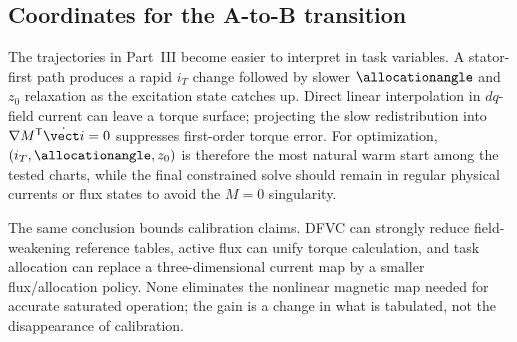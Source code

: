 \subsection{Coordinates for the A-to-B transition}

The trajectories in Part~III become easier to interpret in task variables.
A stator-first path produces a rapid \(i_T\) change followed by slower
\(\allocationangle\) and \(z_0\) relaxation as the excitation state catches up. Direct
linear interpolation in \(dq\)-field current can leave a torque surface;
projecting the slow redistribution into
\(\nabla M^{\mathsf T}\dot{\vect i}=0\) suppresses first-order torque error.
For optimization, \((i_T,\allocationangle,z_0)\) is therefore the most natural warm
start among the tested charts, while the final constrained solve should remain
in regular physical currents or flux states to avoid the \(M=0\) singularity.

The same conclusion bounds calibration claims. DFVC can strongly reduce
field-weakening reference tables, active flux can unify torque calculation,
and task allocation can replace a three-dimensional current map by a smaller
flux/allocation policy. None eliminates the nonlinear magnetic map needed for
accurate saturated operation; the gain is a change in what is tabulated, not
the disappearance of calibration.
